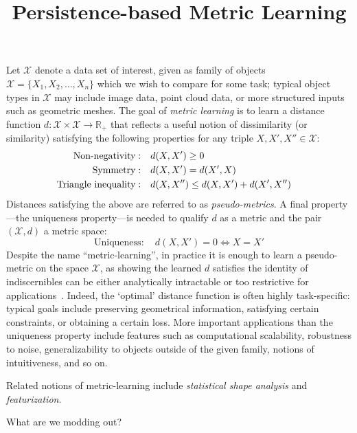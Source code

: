 \documentclass[10pt]{article}
\title{\vspace{-2.0em} Persistence-based Metric Learning \vspace{-0.5em}}
\date{}
\begin{document}
 \vspace{-2em} \maketitle \vspace{-1em}
\noindent
Let $\mathcal{X}$ denote a data set of interest, given as family of objects $\mathcal{X} =\{ X_1, X_2, \dots, X_n \}$ which we wish to compare for some task; typical object types in $\mathcal{X}$ may include image data, point cloud data, or more structured inputs such as geometric meshes. 
The goal of \emph{metric learning} is to learn a distance function $d: \mathcal{X} \times \mathcal{X} \to \mathbb{R}_{+}$ that reflects a useful notion of dissimilarity (or similarity) satisfying the following properties for any triple $X, X', X'' \in \mathcal{X}$: 
\begin{align*}
	\text{Non-negativity}: \quad & d(X, X') \geq 0  \hfill  \\
	\text{Symmetry}: \quad & d(X, X') = d(X', X) \hfill  \\
	\text{Triangle inequality}: \quad & d(X, X'') \leq  d(X, X') + d(X', X'') \quad \hfill 
\end{align*}
Distances satisfying the above are referred to as \emph{pseudo-metrics}. A final property---the uniqueness property---is needed to qualify $d$ as a metric and the pair $(\mathcal{X}, d)$ a metric space:
\begin{equation}
	\text{Uniqueness}: \quad d(X, X') = 0 \Leftrightarrow X = X'
\end{equation}
Despite the name ``metric-learning'', in practice it is enough to learn a pseudo-metric on the space $\mathcal{X}$, as showing the learned $d$ satisfies the identity of indiscernibles can be either analytically intractable or too restrictive for applications~\cite{}. 
Indeed, the `optimal' distance function is often highly task-specific: typical goals include preserving geometrical information, satisfying certain constraints, or obtaining a certain loss. More important applications than the uniqueness property include features such as computational scalability, robustness to noise, generalizability to objects outside of the given family, notions of intuitiveness, and so on.

Related notions of metric-learning include \emph{statistical shape analysis} and \emph{featurization}.

What are we modding out?
\end{document}
